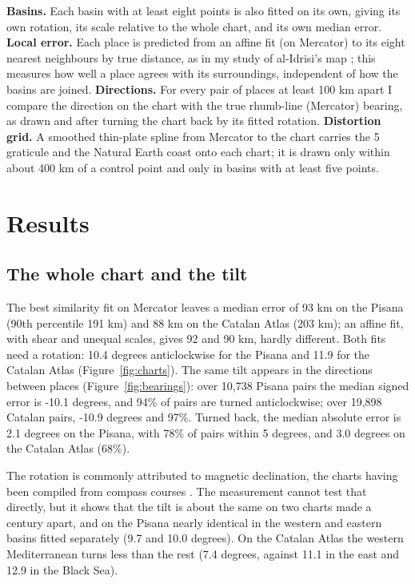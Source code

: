 \documentclass[11pt,a4paper]{article}
\begin{document}
\textbf{Basins.} Each basin with at least eight points is also fitted on its own, giving its own rotation, its scale relative to the whole chart, and its own median error. \textbf{Local error.} Each place is predicted from an affine fit (on Mercator) to its eight nearest neighbours by true distance, as in my study of al-Idrisi's map \citep{hotham_idrisi}; this measures how well a place agrees with its surroundings, independent of how the basins are joined. \textbf{Directions.} For every pair of places at least 100 km apart I compare the direction on the chart with the true rhumb-line (Mercator) bearing, as drawn and after turning the chart back by its fitted rotation. \textbf{Distortion grid.} A smoothed thin-plate spline from Mercator to the chart carries the 5\textdegree{} graticule and the Natural Earth coast onto each chart; it is drawn only within about 400 km of a control point and only in basins with at least five points.

\section{Results}\label{sec:results}
\subsection{The whole chart and the tilt}
The best similarity fit on Mercator leaves a median error of 93 km on the Pisana (90th percentile 191 km) and 88 km on the Catalan Atlas (203 km); an affine fit, with shear and unequal scales, gives 92 and 90 km, hardly different. Both fits need a rotation: 10.4 degrees anticlockwise for the Pisana and 11.9 for the Catalan Atlas (Figure~\ref{fig:charts}). The same tilt appears in the directions between places (Figure~\ref{fig:bearings}): over 10,738 Pisana pairs the median signed error is -10.1 degrees, and 94\% of pairs are turned anticlockwise; over 19,898 Catalan pairs, -10.9 degrees and 97\%. Turned back, the median absolute error is 2.1 degrees on the Pisana, with 78\% of pairs within 5 degrees, and 3.0 degrees on the Catalan Atlas (68\%).

The rotation is commonly attributed to magnetic declination, the charts having been compiled from compass courses \citep{campbell1987,lanman1987}. The measurement cannot test that directly, but it shows that the tilt is about the same on two charts made a century apart, and on the Pisana nearly identical in the western and eastern basins fitted separately (9.7 and 10.0 degrees). On the Catalan Atlas the western Mediterranean turns less than the rest (7.4 degrees, against 11.1 in the east and 12.9 in the Black Sea).
\end{document}
